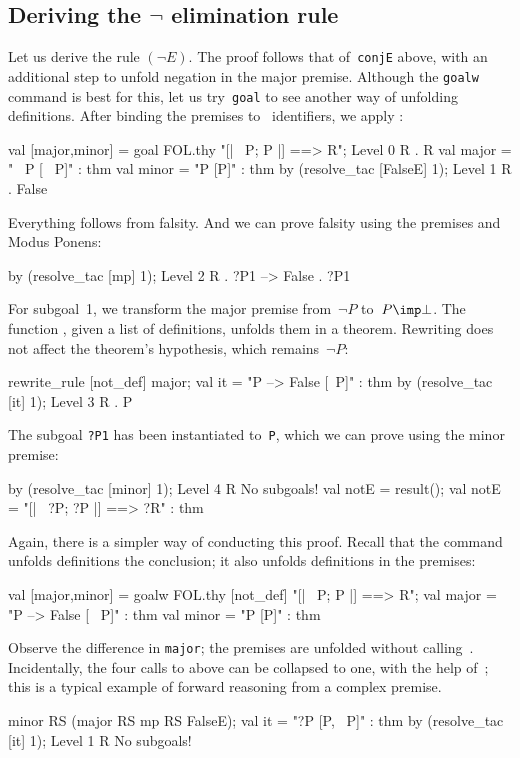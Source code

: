 \subsection{Deriving the $\neg$ elimination rule}
Let us derive the rule $(\neg E)$.  The proof follows that of~{\tt conjE}
above, with an additional step to unfold negation in the major premise.
Although the {\tt goalw} command is best for this, let us
try~{\tt goal} to see another way of unfolding definitions.  After
binding the premises to \ML\ identifiers, we apply :
\begin{ttbox}
val [major,minor] = goal FOL.thy "[| ~P;  P |] ==> R";
{\out Level 0}
{\out R}
{. R}
{\out val major = "~ P  [~ P]" : thm}
{\out val minor = "P  [P]" : thm}
\ttbreak
by (resolve_tac [FalseE] 1);
{\out Level 1}
{\out R}
{. False}
\end{ttbox}
Everything follows from falsity.  And we can prove falsity using the
premises and Modus Ponens:
\begin{ttbox}
by (resolve_tac [mp] 1);
{\out Level 2}
{\out R}
{. ?P1 --> False}
{. ?P1}
\end{ttbox}
For subgoal~1, we transform the major premise from~$\neg P$
to~${P\imp\bot}$.  The function , given a list of
definitions, unfolds them in a theorem.  Rewriting does not
affect the theorem's hypothesis, which remains~$\neg P$:
\begin{ttbox}
rewrite_rule [not_def] major;
{\out val it = "P --> False  [~P]" : thm}
by (resolve_tac [it] 1);
{\out Level 3}
{\out R}
{. P}
\end{ttbox}
The subgoal {\tt?P1} has been instantiated to~{\tt P}, which we can prove
using the minor premise:
\begin{ttbox}
by (resolve_tac [minor] 1);
{\out Level 4}
{\out R}
{\out No subgoals!}
val notE = result();
{\out val notE = "[| ~?P; ?P |] ==> ?R" : thm}
\end{ttbox}

\medskip
Again, there is a simpler way of conducting this proof.  Recall that
the  command unfolds definitions the conclusion; it also
unfolds definitions in the premises:
\begin{ttbox}
val [major,minor] = goalw FOL.thy [not_def]
    "[| ~P;  P |] ==> R";
{\out val major = "P --> False  [~ P]" : thm}
{\out val minor = "P  [P]" : thm}
\end{ttbox}
Observe the difference in {\tt major}; the premises are unfolded without
calling~.  Incidentally, the four calls to
 above can be collapsed to one, with the help
of~; this is a typical example of forward reasoning from a
complex premise.
\begin{ttbox}
minor RS (major RS mp RS FalseE);
{\out val it = "?P  [P, ~P]" : thm}
by (resolve_tac [it] 1);
{\out Level 1}
{\out R}
{\out No subgoals!}
\end{ttbox}

